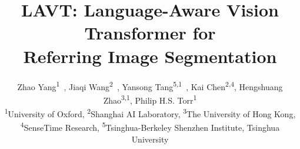 \documentclass[10pt,twocolumn,letterpaper]{article}
\begin{document}
\title{
LAVT: Language-Aware Vision Transformer for \\ Referring Image Segmentation
}
\author{Zhao Yang\textsuperscript{1}\hspace{-0.014cm}\footnotemark[1]~,
        Jiaqi Wang\textsuperscript{2}\hspace{0.01cm}\footnotemark[1]~,
        Yansong Tang\textsuperscript{5,1}\footnotemark[2]~,
        Kai Chen\textsuperscript{2,4},
	    Hengshuang Zhao\textsuperscript{3,1},
	    Philip H.S. Torr\textsuperscript{1}\\
\textsuperscript{1}University of Oxford,
\textsuperscript{2}Shanghai AI Laboratory,
\textsuperscript{3}The University of Hong Kong,\\
\textsuperscript{4}SenseTime Research,
\textsuperscript{5}Tsinghua-Berkeley Shenzhen Institute, Tsinghua University
}

\maketitle
{}
\end{document}

